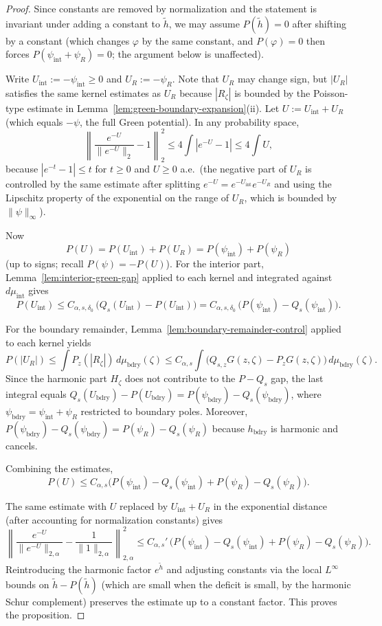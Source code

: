 \begin{proof}
Since constants are removed by normalization and the statement is invariant
under adding a constant to $\widetilde h$, we may assume $P(\widetilde h)=0$ after shifting
by a constant (which changes $\varphi$ by the same constant, and
$P(\varphi)=0$ then forces $P(\psi_{\mathrm{int}}+\psi_R)=0$; the argument
below is unaffected).

Write $U_{\mathrm{int}}:=-\psi_{\mathrm{int}}\ge0$ and
$U_R:=-\psi_{R}$.  Note that $U_R$ may change sign, but $|U_R|$ satisfies
the same kernel estimates as $U_R$ because $|R_\zeta|$ is bounded by the
Poisson-type estimate in Lemma~\ref{lem:green-boundary-expansion}(ii).
Let $U:=U_{\mathrm{int}}+U_R$ (which equals $-\psi$, the full Green
potential).  In any probability space,
\[
\left\|\frac{e^{-U}}{\|e^{-U}\|_2}-1\right\|_2^2
\le 4\int|e^{-U}-1|
\le 4\int U,
\]
because $|e^{-t}-1|\le t$ for $t\ge0$ and $U\ge0$ a.e.\ (the negative part
of $U_R$ is controlled by the same estimate after splitting
$e^{-U}=e^{-U_{\mathrm{int}}}e^{-U_R}$ and using the Lipschitz property of
the exponential on the range of $U_R$, which is bounded by
$\|\psi\|_\infty$).

Now
\[
P(U)=P(U_{\mathrm{int}})+P(U_R)
=P(\psi_{\mathrm{int}})+P(\psi_R)
\]
(up to signs; recall $P(\psi)=-P(U)$).  For the interior part,
Lemma~\ref{lem:interior-green-gap} applied to each kernel and integrated
against $d\mu_{\mathrm{int}}$ gives
\[
P(U_{\mathrm{int}})
\le
C_{\alpha,s,\delta_0}\,
\bigl(Q_s(U_{\mathrm{int}})-P(U_{\mathrm{int}})\bigr)
=
C_{\alpha,s,\delta_0}\,
\bigl(P(\psi_{\mathrm{int}})-Q_s(\psi_{\mathrm{int}})\bigr).
\]

For the boundary remainder,
Lemma~\ref{lem:boundary-remainder-control} applied to each kernel yields
\[
P(|U_R|)
\le
\int P_z(|R_\zeta|)\,d\mu_{\mathrm{bdry}}(\zeta)
\le
C_{\alpha,s}
\int\bigl(Q_{s,z}G(z,\zeta)-P_zG(z,\zeta)\bigr)\,d\mu_{\mathrm{bdry}}(\zeta).
\]
Since the harmonic part $H_\zeta$ does not contribute to the $P-Q_s$ gap,
the last integral equals
$Q_s(U_{\mathrm{bdry}})-P(U_{\mathrm{bdry}})
=P(\psi_{\mathrm{bdry}})-Q_s(\psi_{\mathrm{bdry}})$,
where $\psi_{\mathrm{bdry}}=\psi_{\mathrm{int}}+\psi_R$ restricted to
boundary poles.  Moreover,
$P(\psi_{\mathrm{bdry}})-Q_s(\psi_{\mathrm{bdry}})
=P(\psi_R)-Q_s(\psi_R)$ because $h_{\mathrm{bdry}}$ is harmonic and cancels.

Combining the estimates,
\[
P(U)
\le
C_{\alpha,s}\bigl(P(\psi_{\mathrm{int}})-Q_s(\psi_{\mathrm{int}})
+P(\psi_R)-Q_s(\psi_R)\bigr).
\]

The same estimate with $U$ replaced by $U_{\mathrm{int}}+U_R$ in the
exponential distance (after accounting for normalization constants) gives
\[
\left\|\frac{e^{-U}}{\|e^{-U}\|_{2,\alpha}}
-\frac{1}{\|1\|_{2,\alpha}}\right\|_{2,\alpha}^2
\le
C_{\alpha,s}'\,
\bigl(P(\psi_{\mathrm{int}})-Q_s(\psi_{\mathrm{int}})
+P(\psi_R)-Q_s(\psi_R)\bigr).
\]
Reintroducing the harmonic factor $e^{\widetilde h}$ and adjusting constants via
the local $L^\infty$ bounds on $\widetilde h-P(\widetilde h)$ (which are small when the
deficit is small, by the harmonic Schur complement) preserves the estimate
up to a constant factor.  This proves the proposition.
\end{proof}
